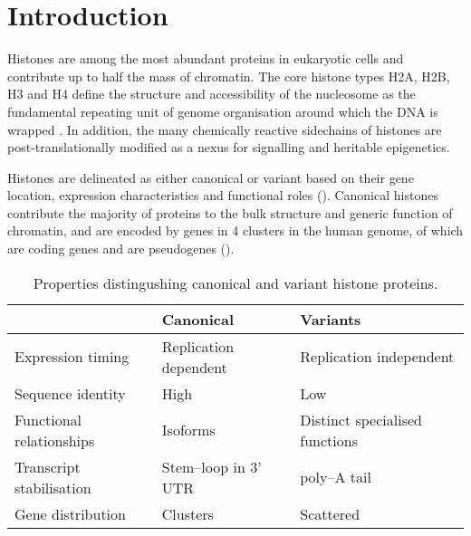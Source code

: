 \section{Introduction}

	Histones are among the most abundant proteins in eukaryotic cells 
	and contribute up to half the mass of chromatin. 
	The core histone types H2A, H2B, H3 and H4 
	define the structure and accessibility of the nucleosome 
	as the fundamental repeating unit of genome organisation 
	around which the DNA is wrapped \citep{Luger1997structure}.
	In addition, the many chemically reactive sidechains of histones 
	are post-translationally modified 
	as a nexus for signalling and heritable epigenetics.

	Histones are delineated as either canonical or variant based on 
	their gene location, expression characteristics and functional roles ().
	Canonical histones contribute the majority of proteins to 
	the bulk structure and generic function of chromatin, 
	and are encoded by \TotalGenes{} genes in 4 clusters in the human genome,
	of which \TotalCodingGenes{} are coding genes and \TotalPseudoGenes{} are pseudogenes ().

\begin{table*}[hp]
	\caption{Properties distingushing canonical and variant histone proteins.}
	\label{tab:typical-histone-differences}
	\centering
	\begin{tabular}{l l l}
		\toprule
		\null			     & Canonical             & Variants \\
		\midrule
		Expression timing         & Replication dependent & Replication independent \\
		Sequence identity         & High			  & Low \\
		Functional relationships  & Isoforms              & Distinct specialised functions \\
		Transcript stabilisation  & Stem--loop in 3' UTR  & poly--A tail \\
		Gene distribution         & Clusters              & Scattered \\
	\bottomrule
	\end{tabular}
\end{table*}

